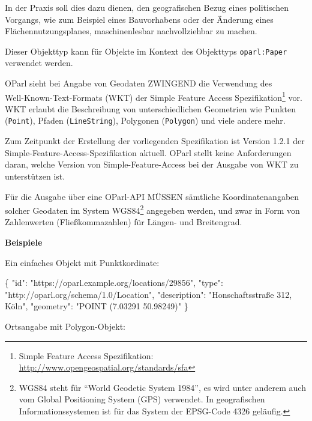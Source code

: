 \documentclass[,a4paper]{article}
\newenvironment{Shaded}{}{}
\newcommand{\DataTypeTok}[1]{\textcolor[rgb]{0.56,0.13,0.00}{{#1}}}
\newcommand{\StringTok}[1]{\textcolor[rgb]{0.25,0.44,0.63}{{#1}}}
\newcommand{\FunctionTok}[1]{\textcolor[rgb]{0.02,0.16,0.49}{{#1}}}
\begin{document}
In der Praxis soll dies dazu dienen, den geografischen Bezug eines
politischen Vorgangs, wie zum Beispiel eines Bauvorhabens oder der
Änderung eines Flächennutzungsplanes, maschinenlesbar nachvollziehbar zu
machen.

Dieser Objekttyp kann für Objekte im Kontext des Objekttyps
\texttt{oparl:Paper} verwendet werden.

OParl sieht bei Angabe von Geodaten ZWINGEND die Verwendung
des\\Well-Known-Text-Formats (WKT) der Simple Feature Access
Spezifikation\footnote{Simple Feature Access Spezifikation:
  \url{http://www.opengeospatial.org/standards/sfa}} vor. WKT erlaubt
die Beschreibung von unterschiedlichen Geometrien wie Punkten
(\texttt{Point}), Pfaden (\texttt{LineString}), Polygonen
(\texttt{Polygon}) und viele andere mehr.

Zum Zeitpunkt der Erstellung der vorliegenden Spezifikation ist Version
1.2.1 der Simple-Feature-Access-Spezifikation aktuell. OParl stellt
keine Anforderungen daran, welche Version von Simple-Feature-Access bei
der Ausgabe von WKT zu unterstützen ist.

Für die Ausgabe über eine OParl-API MÜSSEN sämtliche Koordinatenangaben
solcher Geodaten im System WGS84\footnote{WGS84 steht für ``World
  Geodetic System 1984'', es wird unter anderem auch vom Global
  Positioning System (GPS) verwendet. In geografischen
  Informationssystemen ist für das System der EPSG-Code 4326 geläufig.}
angegeben werden, und zwar in Form von Zahlenwerten (Fließkommazahlen)
für Längen- und Breitengrad.

\textbf{Beispiele}

Ein einfaches Objekt mit Punktkordinate:

\begin{Shaded}
\begin{Highlighting}[]
\FunctionTok{\{}
    \DataTypeTok{"id"}\FunctionTok{:} \StringTok{"https://oparl.example.org/locations/29856"}\FunctionTok{,}
    \DataTypeTok{"type"}\FunctionTok{:} \StringTok{"http://oparl.org/schema/1.0/Location"}\FunctionTok{,}
    \DataTypeTok{"description"}\FunctionTok{:} \StringTok{"Honschaftsstraße 312, Köln"}\FunctionTok{,}
    \DataTypeTok{"geometry"}\FunctionTok{:} \StringTok{"POINT (7.03291 50.98249)"}
\FunctionTok{\}}
\end{Highlighting}
\end{Shaded}

Ortsangabe mit Polygon-Objekt:
\end{document}
